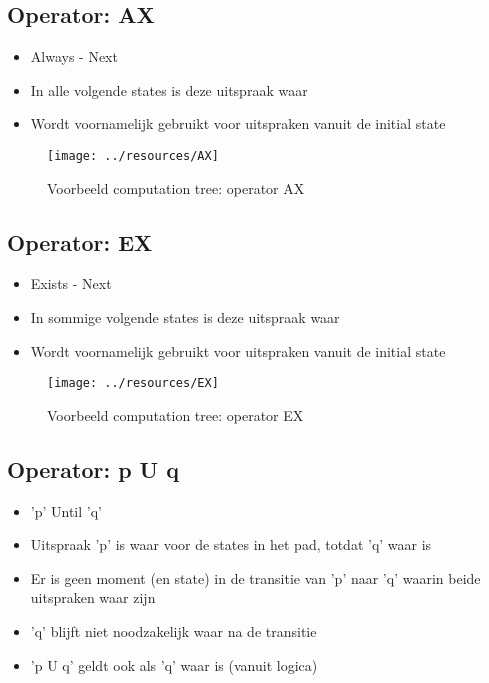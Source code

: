 \documentclass{article}
\begin{document}
  \subsection{Operator: AX}
    \begin{itemize}
      \item Always - Next
      \item In alle volgende states is deze uitspraak waar
      \item Wordt voornamelijk gebruikt voor uitspraken vanuit de initial state
    \end{itemize}
    \begin{figure}[h]
      \centering
      \texttt{[image: ../resources/AX]}
      \caption{Voorbeeld computation tree: operator AX}
      \label{fig:AX}
    \end{figure}


  \subsection{Operator: EX}
    \begin{itemize}
      \item Exists - Next
      \item In sommige volgende states is deze uitspraak waar
      \item Wordt voornamelijk gebruikt voor uitspraken vanuit de initial state
    \end{itemize}
    \begin{figure}[h]
      \centering
      \texttt{[image: ../resources/EX]}
      \caption{Voorbeeld computation tree: operator EX}
      \label{fig:ex}
    \end{figure}


  \subsection{Operator: p U q}
    \begin{itemize}
      \item 'p' Until 'q'
      \item Uitspraak 'p' is waar voor de states in het pad, totdat 'q' waar is
      \item Er is geen moment (en state) in de transitie van 'p' naar 'q' waarin beide uitspraken waar zijn
      \item 'q' blijft niet noodzakelijk waar na de transitie
      \item 'p U q' geldt ook als 'q' waar is (vanuit logica)
    \end{itemize}
\end{document}
